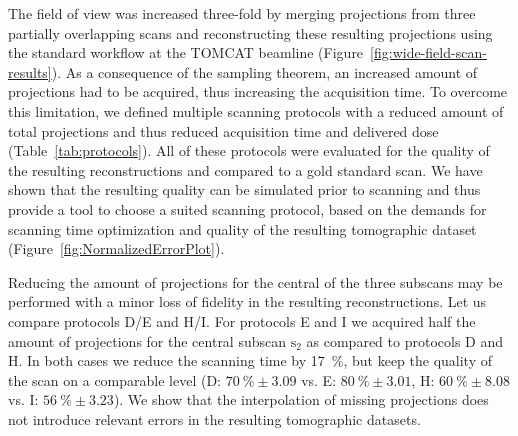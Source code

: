 The field of view was increased three-fold by merging projections from three partially overlapping scans and reconstructing these resulting projections using the standard workflow at the \ac{TOMCAT} beamline (Figure~\ref{fig:wide-field-scan-results}). As a consequence of the sampling theorem, an increased amount of projections had to be acquired, thus increasing the acquisition time. To overcome this limitation, we defined multiple scanning protocols with a reduced amount of total projections and thus reduced acquisition time and delivered dose (Table~\ref{tab:protocols}). All of these protocols were evaluated for the quality of the resulting reconstructions and compared to a gold standard scan. We have shown that the resulting quality can be simulated prior to scanning and thus provide a tool to choose a suited scanning protocol, based on the demands for scanning time optimization and quality of the resulting tomographic dataset (Figure~\ref{fig:NormalizedErrorPlot}). 

Reducing the amount of projections for the central of the three subscans may be performed with a minor loss of fidelity in the resulting reconstructions. Let us compare protocols D/E and H/I. For protocols E and I we acquired half the amount of projections for the central subscan $\textrm{s}_{2}$ as compared to protocols D and H. In both cases we reduce the scanning time by \SI{17}{\percent}, but keep the quality of the scan on a comparable level (D: $\SI{70}{\percent}\pm3.09$ vs. E: $\SI{80}{\percent}\pm3.01$, H: $\SI{60}{\percent}\pm8.08$ vs. I: $\SI{56}{\percent}\pm3.23$).
We show that the interpolation of missing projections does not introduce relevant errors in the resulting tomographic datasets.

